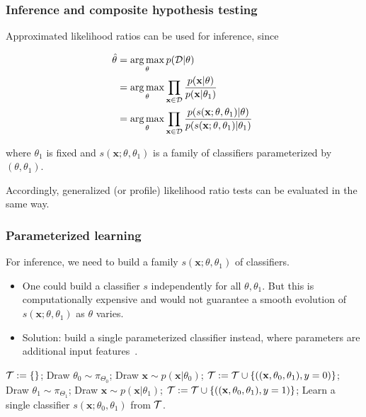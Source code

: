 \documentclass{beamer}
\DeclareMathOperator*{\argmax}{arg\,max}
\let\oldcitep=\citep
\renewcommand\citep[1]{\hyperlink{#1}{\oldcitep{#1}}}
\begin{document}
\begin{frame}
    \frametitle{Inference and composite hypothesis testing}

    Approximated likelihood ratios can be used for inference, since

    {\small
    \begin{align}\label{eqn:mle}
        \hat{\theta} &= \argmax_\theta  p({\cal D} | \theta) \nonumber \\
                     &= \argmax_\theta  \prod_{\mathbf{x} \in {\cal D}} \frac{p(\mathbf{x}| \theta)}{p(\mathbf{x}|\theta_1)} \nonumber \\
                     &= \argmax_\theta  \prod_{\mathbf{x} \in {\cal D}} \frac{p(s(\mathbf{x}; \theta, \theta_1) | \theta)}{p(s(\mathbf{x}; \theta, \theta_1) |\theta_1)} \;
    \end{align}}

    where $\theta_1$ is fixed and $s(\mathbf{x}; \theta, \theta_1)$ is a family of classifiers parameterized by $(\theta, \theta_1)$.

    \vspace{1em}

    Accordingly, generalized (or profile) likelihood ratio tests can be evaluated in the same way.
\end{frame}

\begin{frame}
    \frametitle{Parameterized learning}

    For inference, we need to build a family $s(\mathbf{x}; \theta, \theta_1)$ of classifiers.

    \begin{itemize}
        \item One could build a classifier $s$ independently for all $\theta, \theta_1$. But this is computationally expensive and would not guarantee a smooth evolution of $s(\mathbf{x}; \theta, \theta_1)$ as $\theta$ varies.

        \item Solution: build a single parameterized classifier instead, where parameters are additional input features~\citep{Baldi:2016fzo}.
    \end{itemize}

    {\scriptsize
    \begin{algorithmic}
        \State ${\cal T := \{ \}}$;
            \State Draw $\theta_0 \sim \pi_{\Theta_0}$;
    	    \State Draw $\mathbf{x} \sim p(\mathbf{x}|\theta_0)$;
    		\State ${\cal T} := {\cal T} \cup \{ ((\mathbf{x}, \theta_0, \theta_1), y=0) \}$;
            \State Draw $\theta_1 \sim \pi_{\Theta_1}$;
    		\State Draw $\mathbf{x} \sim p(\mathbf{x}|\theta_1)$;
    		\State ${\cal T} := {\cal T} \cup \{ ((\mathbf{x}, \theta_0, \theta_1), y=1) \}$;
        \EndWhile
        \State Learn a single classifier $s(\mathbf{x}; \theta_0, \theta_1)$ from ${\cal T}$.
    \end{algorithmic}}

\end{frame}
\end{document}
